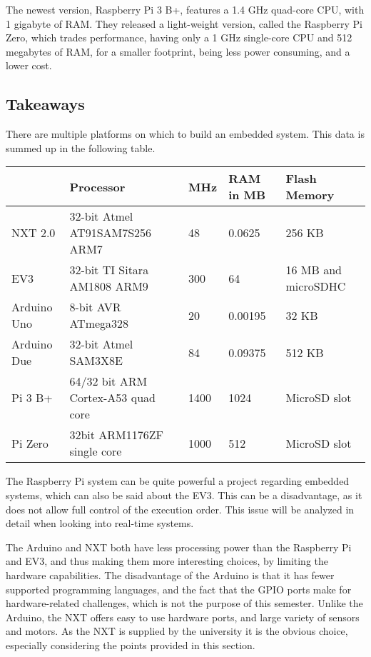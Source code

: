 The newest version, Raspberry Pi 3 B+, features a 1.4 GHz quad-core CPU, with 1 gigabyte of RAM.
They released a light-weight version, called the Raspberry Pi Zero, which trades performance, having only a 1 GHz single-core CPU and 512 megabytes of RAM, for a smaller footprint, being less power consuming, and a lower cost.

\subsection{Takeaways}
\label{platformtakeaways}
There are multiple platforms on which to build an embedded system.
This data is summed up in the following table.

\begin{table}[h]
	\begin{adjustbox}{max width=\textwidth}
	\begin{tabular}{|l|l|l|l|l|}
		\hline
		                & Processor                          & MHz 	& RAM in MB    & Flash Memory          	\\\hline
		NXT 2.0 		& 32-bit Atmel AT91SAM7S256 ARM7     & 48  	& 0.0625   & 256 KB                   	\\
		EV3     		& 32-bit TI Sitara AM1808 ARM9       & 300 	& 64   & 16 MB and microSDHC 			\\
		Arduino Uno    	& 8-bit AVR ATmega328                & 20  	& 0.00195    & 32 KB                    \\
		Arduino Due    	& 32-bit Atmel SAM3X8E               & 84  	& 0.09375   & 512 KB                   	\\
		Pi 3 B+      	& 64/32 bit ARM Cortex-A53 quad core & 1400 & 1024    & MicroSD slot            	\\
		Pi Zero       	& 32bit ARM1176ZF single core        & 1000 & 512  & MicroSD slot 					\\\hline
	\end{tabular}
\end{adjustbox}
\end{table}

The Raspberry Pi system can be quite powerful a project regarding embedded systems, which can also be said about the EV3.
This can be a disadvantage, as it does not allow full control of the execution order.
This issue will be analyzed in detail when looking into real-time systems.

The Arduino and NXT both have less processing power than the Raspberry Pi and EV3, and thus making them more interesting choices, by limiting the hardware capabilities.
The disadvantage of the Arduino is that it has fewer supported programming languages, and the fact that the GPIO ports make for hardware-related challenges, which is not the purpose of this semester.
Unlike the Arduino, the NXT offers easy to use hardware ports, and large variety of sensors and motors.
As the NXT is supplied by the university it is the obvious choice, especially considering the points provided in this section.

